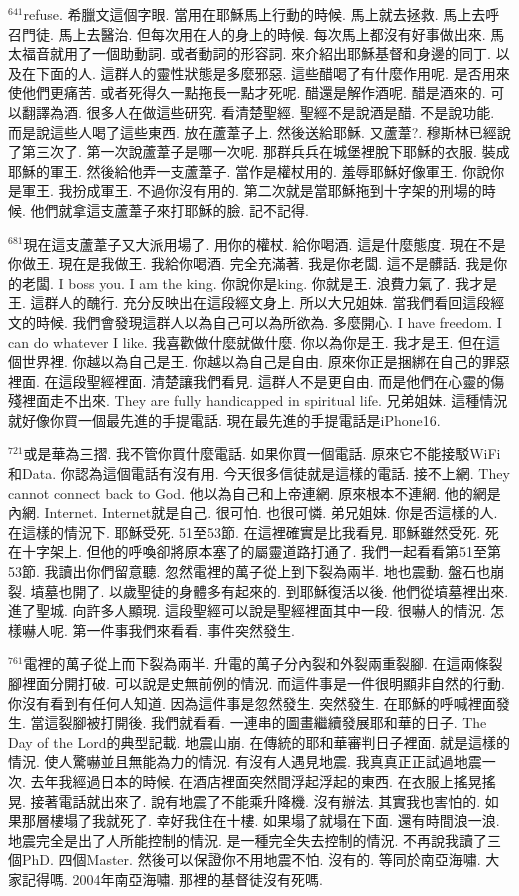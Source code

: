\documentclass{book}
\begin{document}
$^{641}$refuse.
希臘文這個字眼.
當用在耶穌馬上行動的時候.
馬上就去拯救.
馬上去呼召門徒.
馬上去醫治.
但每次用在人的身上的時候.
每次馬上都沒有好事做出來.
馬太福音就用了一個助動詞.
或者動詞的形容詞.
來介紹出耶穌基督和身邊的同丁.
以及在下面的人.
這群人的靈性狀態是多麼邪惡.
這些醋喝了有什麼作用呢.
是否用來使他們更痛苦.
或者死得久一點拖長一點才死呢.
醋還是解作酒呢.
醋是酒來的.
可以翻譯為酒.
很多人在做這些研究.
看清楚聖經.
聖經不是說酒是醋.
不是說功能.
而是說這些人喝了這些東西.
放在蘆葦子上.
然後送給耶穌.
又蘆葦?.
穆斯林已經說了第三次了.
第一次說蘆葦子是哪一次呢.
那群兵兵在城堡裡脫下耶穌的衣服.
裝成耶穌的軍王.
然後給他弄一支蘆葦子.
當作是權杖用的.
羞辱耶穌好像軍王.
你說你是軍王.
我扮成軍王.
不過你沒有用的.
第二次就是當耶穌拖到十字架的刑場的時候.
他們就拿這支蘆葦子來打耶穌的臉.
記不記得.

$^{681}$現在這支蘆葦子又大派用場了.
用你的權杖.
給你喝酒.
這是什麼態度.
現在不是你做王.
現在是我做王.
我給你喝酒.
完全充滿著.
我是你老闆.
這不是髒話.
我是你的老闆.
I boss you.
I am the king.
你說你是king.
你就是王.
浪費力氣了.
我才是王.
這群人的醜行.
充分反映出在這段經文身上.
所以大兄姐妹.
當我們看回這段經文的時候.
我們會發現這群人以為自己可以為所欲為.
多麼開心.
I have freedom.
I can do whatever I like.
我喜歡做什麼就做什麼.
你以為你是王.
我才是王.
但在這個世界裡.
你越以為自己是王.
你越以為自己是自由.
原來你正是捆綁在自己的罪惡裡面.
在這段聖經裡面.
清楚讓我們看見.
這群人不是更自由.
而是他們在心靈的傷殘裡面走不出來.
They are fully handicapped in spiritual life.
兄弟姐妹.
這種情況就好像你買一個最先進的手提電話.
現在最先進的手提電話是iPhone16.

$^{721}$或是華為三摺.
我不管你買什麼電話.
如果你買一個電話.
原來它不能接駁WiFi和Data.
你認為這個電話有沒有用.
今天很多信徒就是這樣的電話.
接不上網.
They cannot connect back to God.
他以為自己和上帝連網.
原來根本不連網.
他的網是內網.
Internet.
Internet就是自己.
很可怕.
也很可憐.
弟兄姐妹.
你是否這樣的人.
在這樣的情況下.
耶穌受死.
51至53節.
在這裡確實是比我看見.
耶穌雖然受死.
死在十字架上.
但他的呼喚卻將原本塞了的屬靈道路打通了.
我們一起看看第51至第53節.
我讀出你們留意聽.
忽然電裡的萬子從上到下裂為兩半.
地也震動.
盤石也崩裂.
墳墓也開了.
以歲聖徒的身體多有起來的.
到耶穌復活以後.
他們從墳墓裡出來.
進了聖城.
向許多人顯現.
這段聖經可以說是聖經裡面其中一段.
很嚇人的情況.
怎樣嚇人呢.
第一件事我們來看看.
事件突然發生.

$^{761}$電裡的萬子從上而下裂為兩半.
升電的萬子分內裂和外裂兩重裂腳.
在這兩條裂腳裡面分開打破.
可以說是史無前例的情況.
而這件事是一件很明顯非自然的行動.
你沒有看到有任何人知道.
因為這件事是忽然發生.
突然發生.
在耶穌的呼喊裡面發生.
當這裂腳被打開後.
我們就看看.
一連串的圖畫繼續發展耶和華的日子.
The Day of the Lord的典型記載.
地震山崩.
在傳統的耶和華審判日子裡面.
就是這樣的情況.
使人驚嚇並且無能為力的情況.
有沒有人遇見地震.
我真真正正試過地震一次.
去年我經過日本的時候.
在酒店裡面突然間浮起浮起的東西.
在衣服上搖晃搖晃.
接著電話就出來了.
說有地震了不能乘升降機.
沒有辦法.
其實我也害怕的.
如果那層樓塌了我就死了.
幸好我住在十樓.
如果塌了就塌在下面.
還有時間浪一浪.
地震完全是出了人所能控制的情況.
是一種完全失去控制的情況.
不再說我讀了三個PhD.
四個Master.
然後可以保證你不用地震不怕.
沒有的.
等同於南亞海嘯.
大家記得嗎.
2004年南亞海嘯.
那裡的基督徒沒有死嗎.
\end{document}
